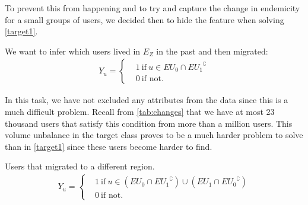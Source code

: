 To prevent this from happening and to try and capture the change in endemicity for a small groups of users, we decided then to hide the feature when solving \cref{target1}.



\begin{problem}\label{target2}
We want to infer which users lived in $E_Z$ in the past and then migrated:
	\begin{align*}
				Y_u =
				\begin{cases}
					&1 \ \mbox{if} \ u \in EU_{0} \cap { EU_{1} }^{\complement}  \\
					&0 \ \mbox{if not}.
				\end{cases}
			\end{align*}
\end{problem}

In this task, we have not excluded any attributes from the data since this is a much difficult problem.
Recall from \cref{tab:changes} that we have at most 23 thousand users that satisfy this condition from more than a million users. This volume unbalance in the target class proves to be a much harder problem to solve than in \cref{target1} since these users become harder to find.



\begin{problem}\label{target3}
Users that migrated to a different region.
\begin{align*}
			Y_u =
			\begin{cases}
				&1 \ \mbox{if} \ u \in (EU_{0} \cap { EU_{1} }^{\complement}) \cup (EU_{1} \cap { EU_{0} }^{\complement}) \\
				&0 \ \mbox{if not}.
			\end{cases}
		\end{align*}
\end{problem}

